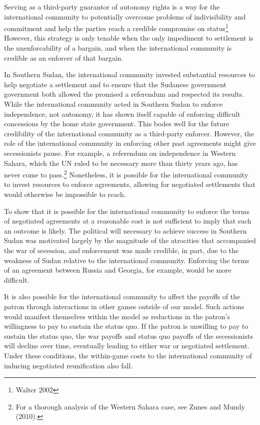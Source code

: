 \documentclass[12pt,letterpaper, notitlepage]{article}
\begin{document}
Serving as a third-party guarantor of autonomy rights is a way for the international community to potentially overcome problems of indivisibility and commitment and help the parties reach a credible compromise on status\footnote{Walter 2002} However, this strategy is only tenable when the only impediment to settlement is the unenforcability of a bargain, and when the international community is credible as an enforcer of that bargain.


In Southern Sudan, the international community invested substantial resources to help negotiate a settlement and to ensure that the Sudanese government government both allowed the promised a referendum and respected its results. While the international community acted in Southern Sudan to enforce independence, not autonomy, it has shown itself capable of enforcing difficult concessions by the home state government. This bodes well for the future credibility of the international community as a third-party enforcer.  However, the role of the international community in enforcing other past agreements might give secessionists pause. For example, a referendum on independence in Western Sahara, which the UN ruled to be necessary more than thirty years ago, has never come to pass.\footnote{For a thorough analysis of the Western Sahara case, see Zunes and Mundy (2010).}  Nonetheless, it is possible for the international community to invest resources to enforce agreements, allowing for negotiated settlements that would otherwise be impossible to reach.

To show that it is possible for the international community to enforce the terms of negotiated agreements at a reasonable cost is not sufficient to imply that such an outcome is likely. The political will necessary to achieve success in Southern Sudan was motivated largely by the magnitude of the atrocities that accompanied the war of secession, and enforcement was made credible, in part, due to the weakness of Sudan relative to the international community. Enforcing the terms of an agreement between Russia and Georgia, for example, would be more difficult.

It is also possible for the international community to affect the payoffs of the patron through interactions in other games outside of our model. Such actions would manifest themselves within the model as reductions in the patron's willingness to pay to sustain the status quo. If the patron is unwilling to pay to sustain the status quo, the war payoffs and status quo payoffs of the secessionists will decline over time, eventually leading to either war or negotiated settlement. Under these conditions, the within-game costs to the international community of inducing negotiated reunification also fall.
\end{document}
